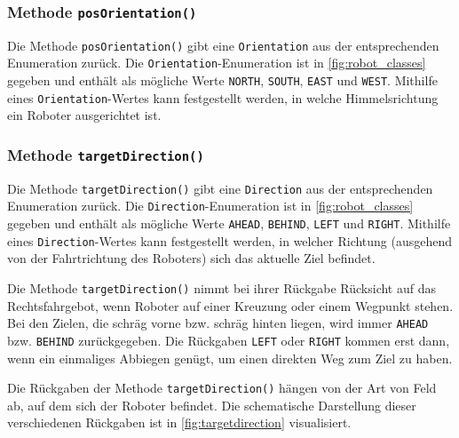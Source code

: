 \subsubsection{Methode \texttt{posOrientation()}}

Die Methode \texttt{posOrientation()} gibt eine \texttt{Orientation} aus der entsprechenden Enumeration zurück.
Die \texttt{Orientation}-Enumeration ist in \autoref{fig:robot_classes} gegeben und enthält als mögliche Werte \texttt{NORTH}, \texttt{SOUTH}, \texttt{EAST} und \texttt{WEST}.
Mithilfe eines \texttt{Orientation}-Wertes kann festgestellt werden, in welche Himmelsrichtung ein Roboter ausgerichtet ist. 

\subsubsection{Methode \texttt{targetDirection()}}
\label{method:targetdirection}

Die Methode \texttt{targetDirection()} gibt eine \texttt{Direction} aus der entsprechenden Enumeration zurück.
Die \texttt{Direction}-Enumeration ist in \autoref{fig:robot_classes} gegeben und enthält als mögliche Werte \texttt{AHEAD}, \texttt{BEHIND}, \texttt{LEFT} und \texttt{RIGHT}.
Mithilfe eines \texttt{Direction}-Wertes kann festgestellt werden, in welcher Richtung (ausgehend von der Fahrtrichtung des Roboters) sich das aktuelle Ziel befindet. 

Die Methode \texttt{targetDirection()} nimmt bei ihrer Rückgabe Rücksicht auf das Rechtsfahrgebot, wenn Roboter auf einer Kreuzung oder einem Wegpunkt stehen. 
Bei den Zielen, die schräg vorne bzw. schräg hinten liegen, wird immer \texttt{AHEAD} bzw. \texttt{BEHIND} zurückgegeben. 
Die Rückgaben \texttt{LEFT} oder \texttt{RIGHT} kommen erst dann, wenn ein einmaliges Abbiegen genügt, um einen direkten Weg zum Ziel zu haben.

Die Rückgaben der Methode \texttt{targetDirection()} hängen von der Art von Feld ab, auf dem sich der Roboter befindet.
Die schematische Darstellung dieser verschiedenen Rückgaben ist in \autoref{fig:targetdirection} visualisiert.

